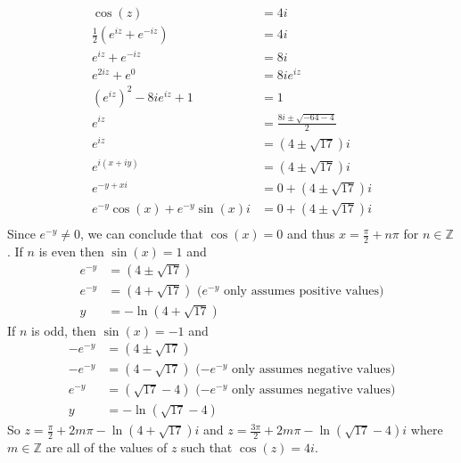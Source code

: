 \documentclass[12pt]{article}
\newcommand{\ZZ}{\mathbb{Z}}
\begin{document}
	\begin{align*}
		\cos(z) &= 4i \\
		\tfrac{1}{2}(e^{iz}+e^{-iz}) &= 4i \\
		e^{iz}+e^{-iz} &= 8i \\
		e^{2iz}+e^{0} &= 8ie^{iz} \\
		(e^{iz})^2 -8i e^{iz} + 1 & = 1 \\
		e^{iz} &= \frac{8i \pm \sqrt{-64 - 4}}{2} \\
		e^{iz} &= (4 \pm \sqrt{17})i \\
		e^{i(x+iy)} &= (4 \pm \sqrt{17})i \\
		e^{-y+xi} &= 0 + (4 \pm \sqrt{17})i \\
		e^{-y}\cos(x) + e^{-y}\sin(x)i &= 0 + (4 \pm \sqrt{17})i \\
	\end{align*}
	Since $e^{-y} \neq 0$, we can conclude that $\cos(x) = 0$ and thus $x = \tfrac{\pi}{2}+n\pi$ for $n \in \ZZ$. If $n$ is even then $\sin(x) = 1$ and 
	\begin{align*}
		e^{-y} & = (4 \pm \sqrt{17}) \\
		e^{-y} & = (4 + \sqrt{17}) \text{\ \ ($e^{-y}$ only assumes positive values)}\\
		y & = -\ln(4 + \sqrt{17})
	\end{align*} 
	If $n$ is odd, then $\sin(x) = -1$ and
	\begin{align*}
		-e^{-y} & = (4 \pm \sqrt{17}) \\
		-e^{-y} & = (4 - \sqrt{17}) \text{\ \ ($-e^{-y}$ only assumes negative values)}\\
		e^{-y} & = (\sqrt{17}-4) \text{\ \ ($-e^{-y}$ only assumes negative values)}\\
		y & = - \ln(\sqrt{17}-4)
	\end{align*}
	So $z = \tfrac{\pi}{2}+2m\pi -\ln(4 + \sqrt{17})i$ and $z = \tfrac{3\pi}{2}+2m\pi - \ln(\sqrt{17}-4)i$ where $m \in \ZZ$ are all of the values of $z$ such that $\cos(z) = 4i$.
	
\end{document}
